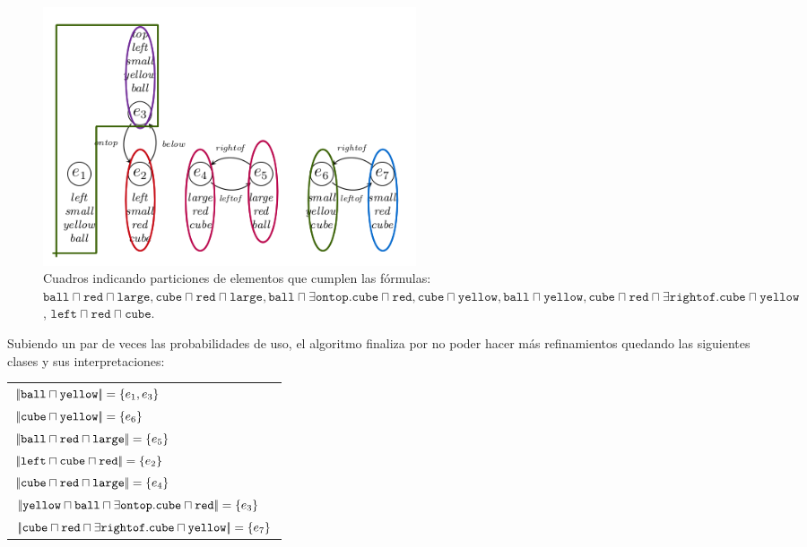\begin{figure}[H]
\begin{center}
\includegraphics[width=11cm]{images/im/left.png}
\caption{Cuadros indicando particiones de elementos que cumplen las f\'ormulas: $\texttt{ball} \sqcap \texttt{red} \sqcap \texttt{large}, \texttt{cube} \sqcap \texttt{red} \sqcap \texttt{large},\texttt{ball} \sqcap \exists \texttt{ontop}. \texttt{cube} \sqcap \texttt{red}, \texttt{cube} \sqcap \texttt{yellow}, \texttt{ball} \sqcap \texttt{yellow}, \texttt{cube} \sqcap \texttt{red} \sqcap \exists \texttt{rightof}. \texttt{cube} \sqcap \texttt{yellow}$, $\texttt{left} \sqcap \texttt{red} \sqcap \texttt{cube}$.}
\label{fig-modelo9f}
\end{center}
\end{figure}

Subiendo un par de veces las probabilidades de uso, el algoritmo finaliza por no poder hacer m\'as refinamientos quedando las siguientes clases y sus interpretaciones:

\medskip
\begin{tabular}{l}
$|\!|\texttt{ball} \sqcap \texttt{yellow}|\!| = \{e_1, e_3\}$  \\
$|\!|\texttt{cube} \sqcap \texttt{yellow} |\!|= \{e_6\}$ \\
$|\!|\texttt{ball} \sqcap \texttt{red} \sqcap \texttt{large}|\!| = \{e_5\}$ \\
$|\!|\texttt{left} \sqcap \texttt{cube} \sqcap \texttt{red}|\!| = \{e_2\}$ \\
$|\!|\texttt{cube} \sqcap \texttt{red} \sqcap \texttt{large}|\!| = \{e_4\}$  \\
$|\!|\texttt{yellow} \sqcap \texttt{ball} \sqcap \exists \texttt{ontop}.\texttt{cube} \sqcap \texttt{red}|\!| = \{e_3\}$ \\ 
$|\!|\texttt{cube} \sqcap \texttt{red} \sqcap \exists \texttt{rightof}. \texttt{cube} \sqcap \texttt{yellow}|\!| = \{e_7\}$
\end{tabular}
\medskip

